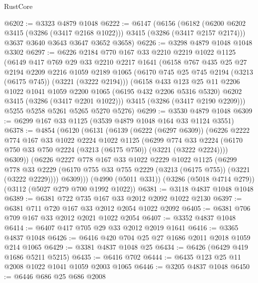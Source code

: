 \begin{lexlean}{RustCore}
\begin{coremodule}
@6202 := @3323 @4879 @1048
@6222 := @6147
    (@6156
      (@6182 (@6200 @6202 @3415 (@3286 (@3417 @2168 @1022))) @3415 (@3286 (@3417 @2157 @2174)))
      @3637
      @3640
      @3643
      @3647
      @3652
      @3658)
@6226 := @3298 @4879 @1048 @1048 @3302
@6297 := @6226
    @2184
    @770
    @167
    @33
    @2210
    @2219
    @1022
    @1125
    (@6149
      @417
      @769
      @29
      @33
      @2210
      @2217
      @1641
      (@6158
        @767
        @435
        @25
        @27
        @2194
        @2209
        @2216
        @1059
        @2189
        @1065
        (@6170 @745 @25 @745 @2194 (@3213 (@6175 @745)) (@3221 (@3222 @2194)))
        (@6158
          @433
          @123
          @25
          @11
          @2206
          @1022
          @1041
          @1059
          @2200
          @1065
          (@6195 @432 @2206 @5316 @5320)
          @6202
          @3415
          (@3286 (@3417 @2201 @1022)))
        @3415
        (@3286 (@3417 @2190 @2209)))
      @5255
      @5258
      @5261
      @5265
      @5270
      @5276)
@6299 := @3530 @4879 @1048
@6309 := @6299 @167 @33 @1125 (@3539 @4879 @1048 @164 @33 @1124 @3551)
@6378 := @4854
    (@6120
      (@6131
        (@6139
          (@6222 (@6297 @6309))
          (@6226
            @2222
            @774
            @167
            @33
            @1022
            @2224
            @1022
            @1125
            (@6299
              @774
              @33
              @2224
              (@6170 @750 @33 @750 @2224 (@3213 (@6175 @750)) (@3221 (@3222 @2224))))
            @6309))
        (@6226
          @2227
          @778
          @167
          @33
          @1022
          @2229
          @1022
          @1125
          (@6299
            @778
            @33
            @2229
            (@6170 @755 @33 @755 @2229 (@3213 (@6175 @755)) (@3221 (@3222 @2229))))
          @6309)))
    (@4990 (@5011 @331))
    (@3286 (@5018 @4714 @279))
    (@3112 (@5027 @279 @700 @1992 @1022))
@6381 := @3118 @4837 @1048 @1048
@6389 := @6381 @722 @735 @167 @33 @2012 @2092 @1022 @2130
@6397 := @6381 @711 @720 @167 @33 @2012 @2054 @1022 @2092
@6405 := @6381 @706 @709 @167 @33 @2012 @2021 @1022 @2054
@6407 := @3352 @4837 @1048
@6414 := @6407 @417 @705 @29 @33 @2012 @2019 @1641
@6416 := @3365 @4837 @1048
@6426 := @6416 @420 @704 @25 @27 @1686 @2011 @2018 @1059 @214 @1065
@6429 := @3381 @4837 @1048 @25
@6434 := @6426 (@6429 @419 @1686 @5211 @5215)
@6435 := @6416 @702
@6444 := @6435 @123 @25 @11 @2008 @1022 @1041 @1059 @2003 @1065
@6446 := @3205 @4837 @1048
@6450 := @6446 @686 @25 @686 @2008

\end{coremodule}
\end{lexlean}

